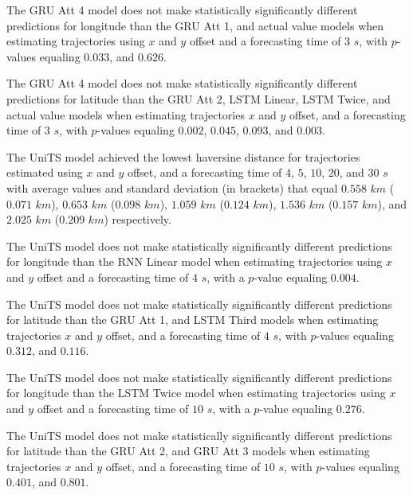 The GRU Att 4 model does not make statistically significantly different predictions for longitude than the GRU Att 1, and actual value models when estimating trajectories using $x$ and $y$ offset and a forecasting time of $3$ $s$, with $p$-values equaling $0.033$, and $0.626$.

The GRU Att 4 model does not make statistically significantly different predictions for latitude than the GRU Att 2, LSTM Linear, LSTM Twice, and actual value models when estimating trajectories $x$ and $y$ offset, and a forecasting time of $3$ $s$, with $p$-values equaling $0.002$, $0.045$, $0.093$, and $0.003$.

The UniTS model achieved the lowest haversine distance for trajectories estimated using $x$ and $y$ offset, and a forecasting time of $4$, $5$, $10$, $20$, and $30$ $s$ with average values and standard deviation (in brackets) that equal $0.558$ $km$ ($0.071$ $km$), $0.653$ $km$ ($0.098$ $km$), $1.059$ $km$ ($0.124$ $km$), $1.536$ $km$ ($0.157$ $km$), and $2.025$ $km$ ($0.209$ $km$) respectively.

The UniTS model does not make statistically significantly different predictions for longitude than the RNN Linear model when estimating trajectories using $x$ and $y$ offset and a forecasting time of $4$ $s$, with a $p$-value equaling $0.004$.

The UniTS model does not make statistically significantly different predictions for latitude than the GRU Att 1, and LSTM Third models when estimating trajectories $x$ and $y$ offset, and a forecasting time of $4$ $s$, with $p$-values equaling $0.312$, and $0.116$.

The UniTS model does not make statistically significantly different predictions for longitude than the LSTM Twice model when estimating trajectories using $x$ and $y$ offset and a forecasting time of $10$ $s$, with a $p$-value equaling $0.276$.

The UniTS model does not make statistically significantly different predictions for latitude than the GRU Att 2, and GRU Att 3 models when estimating trajectories $x$ and $y$ offset, and a forecasting time of $10$ $s$, with $p$-values equaling $0.401$, and $0.801$.

